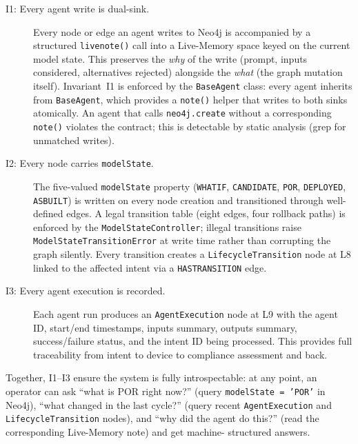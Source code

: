 \documentclass[acmtog]{acmart}
\renewcommand\_{\textunderscore\allowbreak}
\begin{document}
\begin{description}
  \item[I1: Every agent write is dual-sink.] Every node or edge an
    agent writes to Neo4j is accompanied by a structured
    \texttt{live\_note()} call into a Live-Memory space keyed on the
    current model state. This preserves the \emph{why} of the write
    (prompt, inputs considered, alternatives rejected) alongside the
    \emph{what} (the graph mutation itself). Invariant~I1 is enforced
    by the \texttt{BaseAgent} class: every agent inherits from
    \texttt{BaseAgent}, which provides a \texttt{\_note()} helper
    that writes to both sinks atomically. An agent that calls
    \texttt{neo4j.create\_*} without a corresponding
    \texttt{\_note()} violates the contract; this is detectable by
    static analysis (grep for unmatched writes).

  \item[I2: Every node carries \texttt{modelState}.] The five-valued
    \texttt{modelState} property (\texttt{WHAT\_IF}, \texttt{CANDIDATE},
    \texttt{POR}, \texttt{DEPLOYED}, \texttt{AS\_BUILT}) is written on
    every node creation and transitioned through well-defined edges. A
    legal transition table (eight edges, four rollback paths) is
    enforced by the \texttt{ModelStateController}; illegal transitions
    raise \texttt{ModelStateTransitionError} at write time rather than
    corrupting the graph silently. Every transition creates a
    \texttt{LifecycleTransition} node at L8 linked to the affected
    intent via a \texttt{HAS\_TRANSITION} edge.

  \item[I3: Every agent execution is recorded.] Each agent run
    produces an \texttt{AgentExecution} node at L9 with the agent
    ID, start/end timestamps, inputs summary, outputs summary,
    success/failure status, and the intent ID being processed. This
    provides full traceability from intent to device to compliance
    assessment and back.
\end{description}

Together, I1--I3 ensure the system is fully introspectable: at any
point, an operator can ask ``what is POR right now?'' (query
\texttt{modelState = 'POR'} in Neo4j), ``what changed in the last
cycle?'' (query recent \texttt{AgentExecution} and
\texttt{LifecycleTransition} nodes), and ``why did the agent do
this?'' (read the corresponding Live-Memory note) and get machine-
structured answers.


\end{document}

